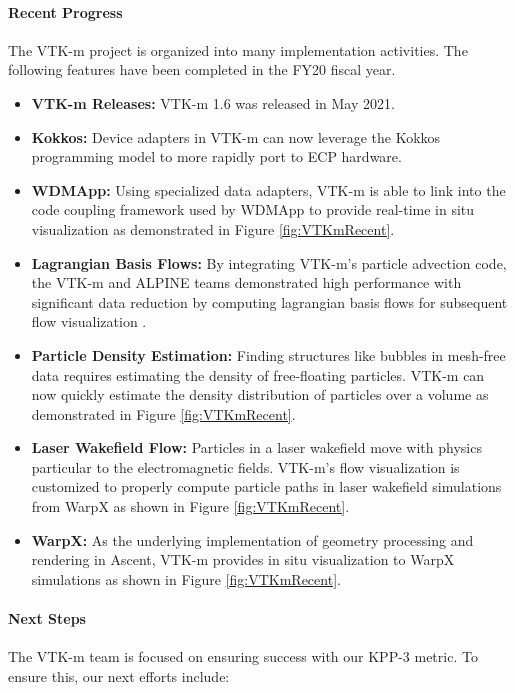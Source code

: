 \paragraph{Recent Progress}
The VTK-m project is organized into many implementation activities.
The following features have been completed in the FY20 fiscal year.

\begin{itemize}
\item \textbf{VTK-m Releases:}
  VTK-m 1.6 was released in May 2021.
\item \textbf{Kokkos:}
  Device adapters in VTK-m can now leverage the Kokkos programming model to more rapidly port to ECP hardware.
\item \textbf{WDMApp:}
  Using specialized data adapters, VTK-m is able to link into the code coupling framework used by WDMApp to provide real-time in situ visualization as demonstrated in Figure \ref{fig:VTKmRecent}.
\item \textbf{Lagrangian Basis Flows:}
  By integrating VTK-m's particle advection code, the VTK-m and ALPINE teams demonstrated high performance with significant data reduction by computing lagrangian basis flows for subsequent flow visualization \cite{Sane2021:EGPGV,Sane2021:ICCS}.
\item \textbf{Particle Density Estimation:}
  Finding structures like bubbles in mesh-free data requires estimating the density of free-floating particles. VTK-m can now quickly estimate the density distribution of particles over a volume as demonstrated in Figure \ref{fig:VTKmRecent}.
\item \textbf{Laser Wakefield Flow:}
  Particles in a laser wakefield move with physics particular to the electromagnetic fields. VTK-m's flow visualization is customized to properly compute particle paths in laser wakefield simulations from WarpX as shown in Figure \ref{fig:VTKmRecent}.
\item \textbf{WarpX:}
  As the underlying implementation of geometry processing and rendering in Ascent, VTK-m provides in situ visualization to WarpX simulations as shown in Figure \ref{fig:VTKmRecent}.
\end{itemize}

\paragraph{Next Steps}
The VTK-m team is focused on ensuring success with our KPP-3 metric.
To ensure this, our next efforts include:

